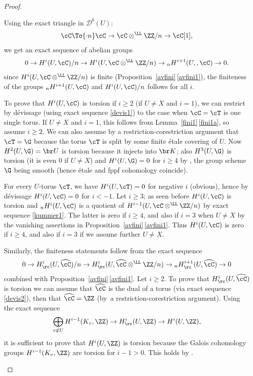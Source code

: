 \skpt
\begin{proof}
\begin{enumeratea}
\item
Using the exact triangle in ${\mathcal D}^b(U)$:
\[
\cC \To{\cdot n} \cC \to \cC
\otimes^\LL \ZZ/n \to \cC[1],
\]
we get an exact sequence of abelian groups
\begin{equation} \label {kummer1}
0 \to H^i(U,\cC)/n \to H^i(U,\cC \otimes^\LL \ZZ/n)
\to{}_n H^{i+1}(U,,\cC) \to 0.
\end{equation}
since $H^i(U,\cC \otimes^\LL \ZZ/n)$ is finite
(Proposition~\ref{avfini}\,\eqref{avfini1}), the finiteness of the groups
$_n H^{i+1}(U, \cC)$ and $H^i(U, \cC)/n$ follows
for all $i$.

To prove that $H^i(U, \cC)$ is torsion if $i \geq 2 $ (\resp if $U \neq X$ and $i=1$), we can restrict by dévissage (using
exact sequence \eqref{devis1}) to the case when
$\cC=\cT$ is one single torus. If $U \neq X$ and $i=1$,
this follows from Lemma~\ref{fini1}\,\eqref{fini1a}, so assume $i \geq 2$.
We can also assume by a restriction-corestriction argument
that $\cT=\G$
because the torus $\cT$ is split by some finite
étale covering of $U$.
Now $H^2(U,\G)=\br U$ is torsion because it injects into $\br K$;
also $H^3(U,\G)$ is torsion (it is
even $0$ if $U \neq X$) and $H^i(U,\G)=0$ for $i \geq 4$ by \cite[Prop.\,II.2.1]{MilADT}, the group scheme $\G$ being smooth (hence étale and fppf
cohomology coincide).

For every $U$-torus $\cT$, we have
$H^i(U,\cT)=0$ for negative $i$ (obvious), hence by dévissage
$H^i(U,\cC)=0$ for $i <-1$. Let $i \geq 3$; as seen before
$H^i(U,\cC)$ is torsion and $_n H^i(U,\cC)$ is
a quotient of $H^{i-1}(U,\cC \otimes^\LL \ZZ/n)$ by exact
sequence \eqref{kummer1}. The latter is zero if $i \geq 4$, and also
if $i=3$ when $U \neq X$ by
the vanishing assertions in Proposition~\ref{avfini}\,\eqref{avfini1}. Thus
$H^i(U,\cC)$ is zero if $i \geq 4$, and also if $i=3$ if we
assume further $U \neq X$.

\item
Similarly, the finiteness statements follow from the exact sequence
\begin{equation} \label{kummer2}
0 \to H^i_\rc(U,\widehat \cC)/n \to H^i_\rc(U,\widehat \cC
\otimes^\LL \ZZ/n) \to {}_n H^{i+1}_\rc(U,\widehat \cC) \to 0
\end{equation}
combined with Proposition~\ref{avfini}\,\eqref{avfini1}. Let $i \geq 2$. To prove that
$H^i_\rc(U,\widehat \cC)$ is torsion we can assume that $\widehat
\cC$ is the dual of a torus (via exact sequence \eqref{devis2}),
then that
$\widehat \cC=\ZZ$ (by~a restriction-corestriction argument).
Using the exact sequence
\[
\bigoplus_{v \not \in U} H^{i-1}(K_v, \ZZ) \to H^i_\rc(U, \ZZ) \to
H^i(U, \ZZ),
\]
it is sufficient to prove that $H^i(U,\ZZ)$ is torsion because the Galois
cohomology groups $H^{i-1}(K_v, \ZZ)$ are torsion for $i-1>0$. This holds
by \cite[Lem.\,II.2.10]{MilADT}.


\end{enumeratea}
\end{proof}
